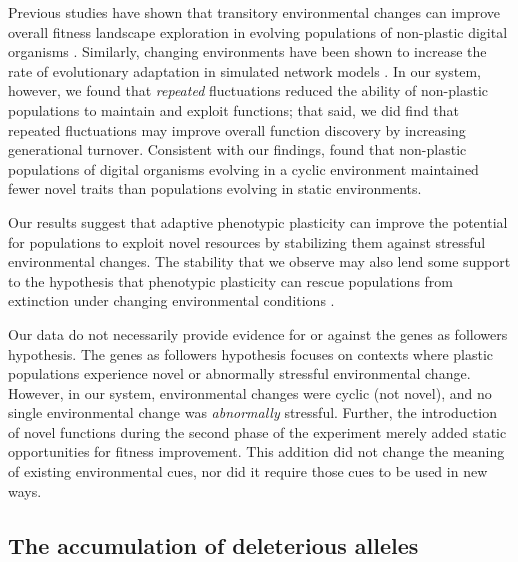 \documentclass[utf8]{frontiersSCNS} %
\begin{document}
\begin{raggedbottom}
Previous studies have shown that transitory environmental changes can improve overall fitness landscape exploration in evolving populations of non-plastic digital organisms \citep{nahum_improved_2017}.
Similarly, changing environments have been shown to increase the rate of evolutionary adaptation in simulated network models \citep{kashtan2007varying}.
In our system, however, we found that \textit{repeated} fluctuations reduced the ability of non-plastic populations to maintain and exploit functions; that said, we did find that repeated fluctuations may improve overall function discovery by increasing generational turnover.
Consistent with our findings, \cite{canino-koning_fluctuating_2019} found that non-plastic populations of digital organisms evolving in a cyclic environment maintained fewer novel traits than populations evolving in static environments.

Our results suggest that adaptive phenotypic plasticity can improve the potential for populations to exploit novel resources by stabilizing them against stressful environmental changes.
The stability that we observe may also lend some support to the hypothesis that phenotypic plasticity can rescue populations from extinction under changing environmental conditions \citep{chevin_adaptation_2010}.

Our data do not necessarily provide evidence for or against the genes as followers hypothesis.
The genes as followers hypothesis focuses on contexts where plastic populations experience novel or abnormally stressful environmental change.
However, in our system, environmental changes were cyclic (not novel), and no single environmental change was \textit{abnormally} stressful.
Further, the introduction of novel functions during the second phase of the experiment merely added static opportunities for fitness improvement.
This addition did not change the meaning of existing environmental cues, nor did it require those cues to be used in new ways.

\subsection{The accumulation of deleterious alleles}


\end{raggedbottom}
\end{document}

